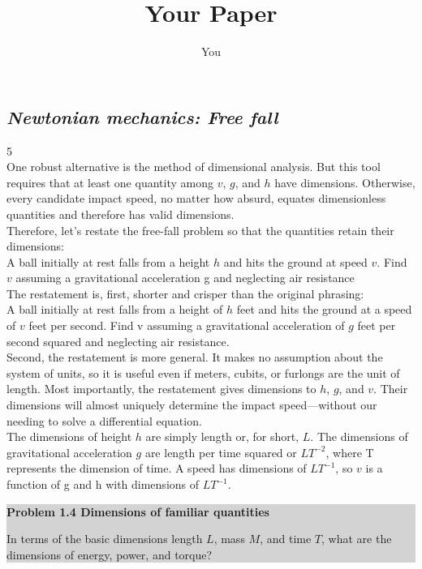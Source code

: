 \documentclass[a4paper]{article}
\title{Your Paper}
\author{You}
\numberwithin{equation}{section}
\begin{document}
\subsection{\textit{Newtonian mechanics: Free fall}}\hfill {5}\\

{\large One robust alternative is the method of dimensional analysis. But this
tool requires that at least one quantity among $v$, $g$, and $h$ have dimensions.
Otherwise, every candidate impact speed, no matter how absurd, equates
dimensionless quantities and therefore has valid dimensions.
\\

Therefore, let’s restate the free-fall problem so that the quantities retain
  their dimensions:}
\\

{\normalsize A ball initially at rest falls from a height $h$ and hits the ground at speed $v$.
Find $v$ assuming a gravitational acceleration g and neglecting air resistance} 
\\

{\large The restatement is, first, shorter and crisper than the original phrasing:}
\\

{\normalsize A ball initially at rest falls from a height of $h$ feet and hits the ground at a
speed of $v$ feet per second. Find v assuming a gravitational acceleration of $g$
feet per second squared and neglecting air resistance.}
\\

{\large Second, the restatement is more general. It makes no assumption about
the system of units, so it is useful even if meters, cubits, or furlongs are
the unit of length. Most importantly, the restatement gives dimensions to
$h$, $g$, and $v$. Their dimensions will almost uniquely determine the impact
speed—without our needing to solve a differential equation.
\\

The dimensions of height $h$ are simply length or, for short, $L$. The dimensions           
of gravitational acceleration $g$ are length per time squared or $LT^{−2}$,
where T represents the dimension of time. A speed has dimensions of
$LT^{−1}$, so $v$ is a function of g and h with dimensions of $LT^{−1}$.}
\\

\colorbox{lightgray}{
\begin{minipage}{\textwidth}
 {\normalsize\textbf{Problem 1.4 Dimensions of familiar quantities}

In terms of the basic dimensions length $L$, mass $M$, and time $T$, what are the
dimensions of energy, power, and torque?}
\end{minipage}
}
\\
\end{document}
